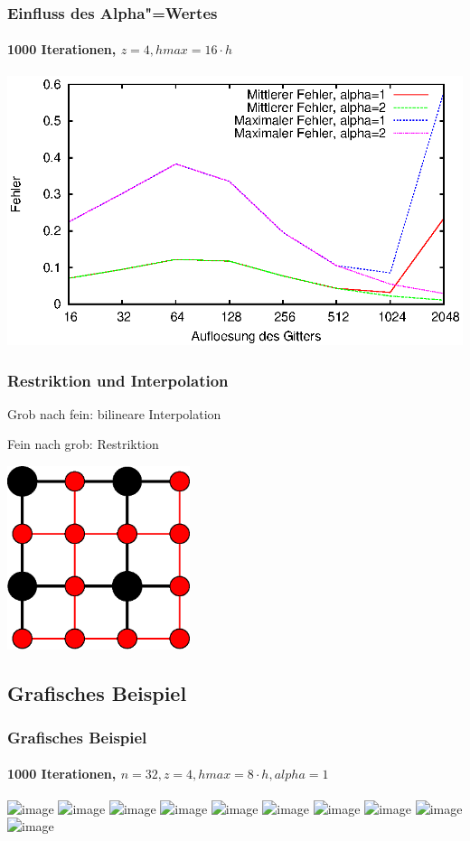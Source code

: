 \documentclass{beamer}
\begin{document}
\begin{frame}
    \frametitle{Einfluss des Alpha"=Wertes}
    \framesubtitle{1000 Iterationen, $z = 4, hmax = 16 \cdot h$}
    \includegraphics[width=\textwidth]{plots/fehlermehrgitter}
\end{frame}

\begin{frame}
    \frametitle{Restriktion und Interpolation}
    Grob nach fein: bilineare Interpolation
    
    Fein nach grob: Restriktion
    \begin{center}
        \includegraphics[width=0.4\textwidth]{interpolation}
    \end{center}
\end{frame}

\subsection{Grafisches Beispiel}
\begin{frame}
    \frametitle{Grafisches Beispiel}
    \framesubtitle{1000 Iterationen, $n=32, z=4, hmax=8 \cdot h, alpha=1$}
    \includegraphics<1>[trim=25 0 25 0, clip, width=\textwidth]{plots/000}
    \includegraphics<2>[trim=25 0 25 0, clip, width=\textwidth]{plots/001}
    \includegraphics<3>[trim=25 0 25 0, clip, width=\textwidth]{plots/002}
    \includegraphics<4>[trim=25 0 25 0, clip, width=\textwidth]{plots/003}
    \includegraphics<5>[trim=25 0 25 0, clip, width=\textwidth]{plots/004}
    \includegraphics<6>[trim=25 0 25 0, clip, width=\textwidth]{plots/005}
    \includegraphics<7>[trim=25 0 25 0, clip, width=\textwidth]{plots/006}
    \includegraphics<8>[trim=25 0 25 0, clip, width=\textwidth]{plots/007}
    \includegraphics<9>[trim=25 0 25 0, clip, width=\textwidth]{plots/008}
    \includegraphics<10>[trim=25 0 25 0, clip, width=\textwidth]{plots/009}
\end{frame}
\end{document}
